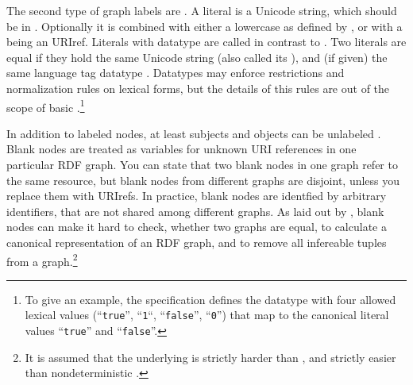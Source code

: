The second type of graph labels are . A
literal is a Unicode string, which should be in .
Optionally it is combined with either a lowercase  as
defined by \textcite{RFC4646}, or with a  being an URIref.
Literals with datatype are called  in contrast to
. Two literals are equal if they hold the same Unicode
string (also called its ), and
(if given) the same language tag datatype . Datatypes may enforce
restrictions and normalization rules on lexical forms, but the details of this
rules are out of the scope of basic .\footnote{To give an example,
the  specification \cite{Biron2004} defines the datatype
 with four allowed lexical values (``\texttt{true}'',
``\texttt{1}``, ``\texttt{false}'', ``\texttt{0}'') that map to the canonical
literal values ``\texttt{true}'' and ``\texttt{false}''.}

In addition to labeled nodes, at least subjects and objects can be unlabeled
. Blank nodes are treated as variables for 
unknown URI references in one particular RDF graph. You can state that two
blank nodes in one graph refer to the same resource, but blank nodes from
different graphs are disjoint, unless you replace them with URIrefs. In
practice, blank nodes are identfied by arbitrary identifiers, that are not
shared among different graphs. As laid out by \textcite{Carroll2003}, blank
nodes can make it hard to check, whether two graphs are equal, to calculate 
a canonical representation of an RDF graph, and to remove all infereable
tuples from a graph.\footnote{\label{fn:gi}It is assumed
that the underlying  is strictly harder 
than , and strictly easier than nondeterministic 
 \cite{Kobler2006}.}


